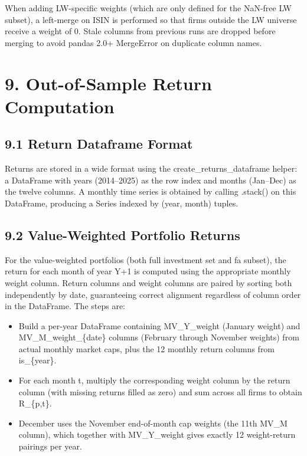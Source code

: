 \documentclass[
  11pt,
]{article}
\begin{document}
When adding LW-specific weights (which are only defined for the NaN-free
LW subset), a left-merge on ISIN is performed so that firms outside the
LW universe receive a weight of 0. Stale columns from previous runs are
dropped before merging to avoid pandas 2.0+ MergeError on duplicate
column names.

\hypertarget{out-of-sample-return-computation}{%
\section{9. Out-of-Sample Return
Computation}\label{out-of-sample-return-computation}}

\hypertarget{return-dataframe-format}{%
\subsection{9.1 Return Dataframe Format}\label{return-dataframe-format}}

Returns are stored in a wide format using the create\_returns\_dataframe
helper: a DataFrame with years (2014--2025) as the row index and months
(Jan--Dec) as the twelve columns. A monthly time series is obtained by
calling .stack() on this DataFrame, producing a Series indexed by (year,
month) tuples.

\hypertarget{value-weighted-portfolio-returns}{%
\subsection{9.2 Value-Weighted Portfolio
Returns}\label{value-weighted-portfolio-returns}}

For the value-weighted portfolios (both full investment set and fa
subset), the return for each month of year Y+1 is computed using the
appropriate monthly weight column. Return columns and weight columns are
paired by sorting both independently by date, guaranteeing correct
alignment regardless of column order in the DataFrame. The steps are:

\begin{itemize}
\item
  Build a per-year DataFrame containing MV\_Y\_weight (January weight)
  and MV\_M\_weight\_\{date\} columns (February through November
  weights) from actual monthly market caps, plus the 12 monthly return
  columns from is\_\{year\}.
\item
  For each month t, multiply the corresponding weight column by the
  return column (with missing returns filled as zero) and sum across all
  firms to obtain R\_\{p,t\}.
\item
  December uses the November end-of-month cap weights (the 11th MV\_M
  column), which together with MV\_Y\_weight gives exactly 12
  weight-return pairings per year.
\end{itemize}
\end{document}

